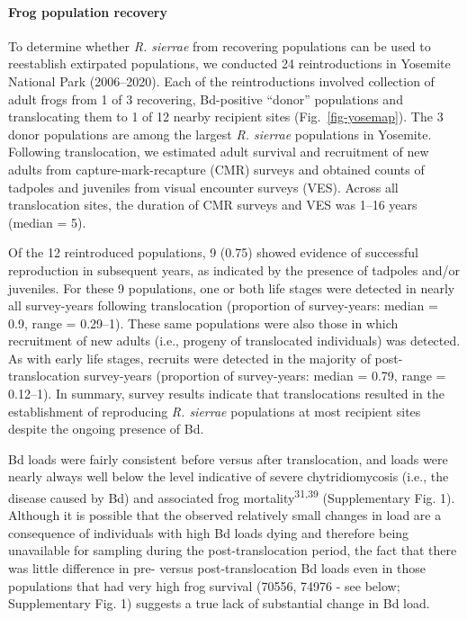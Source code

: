 \documentclass[
  letterpaper,
  DIV=11,
  numbers=noendperiod]{scrartcl}
\let\oldparagraph\paragraph
\renewcommand{\paragraph}[1]{\oldparagraph{#1}\mbox{}}
\begin{document}
\paragraph{Frog population recovery}\label{frog-population-recovery}

To determine whether \emph{R. sierrae} from recovering populations can
be used to reestablish extirpated populations, we conducted 24
reintroductions in Yosemite National Park (2006--2020). Each of the
reintroductions involved collection of adult frogs from 1 of 3
recovering, Bd-positive ``donor'' populations and translocating them to
1 of 12 nearby recipient sites (Fig.~\ref{fig-yosemap}). The 3 donor
populations are among the largest \emph{R. sierrae} populations in
Yosemite. Following translocation, we estimated adult survival and
recruitment of new adults from capture-mark-recapture (CMR) surveys and
obtained counts of tadpoles and juveniles from visual encounter surveys
(VES). Across all translocation sites, the duration of CMR surveys and
VES was 1--16 years (median = 5).

Of the 12 reintroduced populations, 9 (0.75) showed evidence of
successful reproduction in subsequent years, as indicated by the
presence of tadpoles and/or juveniles. For these 9 populations, one or
both life stages were detected in nearly all survey-years following
translocation (proportion of survey-years: median = 0.9, range =
0.29--1). These same populations were also those in which recruitment of
new adults (i.e., progeny of translocated individuals) was detected. As
with early life stages, recruits were detected in the majority of
post-translocation survey-years (proportion of survey-years: median =
0.79, range = 0.12--1). In summary, survey results indicate that
translocations resulted in the establishment of reproducing \emph{R.
sierrae} populations at most recipient sites despite the ongoing
presence of Bd.

Bd loads were fairly consistent before versus after translocation, and
loads were nearly always well below the level indicative of severe
chytridiomycosis (i.e., the disease caused by Bd) and associated frog
mortality\textsuperscript{31,39} (Supplementary Fig. 1). Although it is
possible that the observed relatively small changes in load are a
consequence of individuals with high Bd loads dying and therefore being
unavailable for sampling during the post-translocation period, the fact
that there was little difference in pre- versus post-translocation Bd
loads even in those populations that had very high frog survival (70556,
74976 - see below; Supplementary Fig. 1) suggests a true lack of
substantial change in Bd load.
\end{document}
